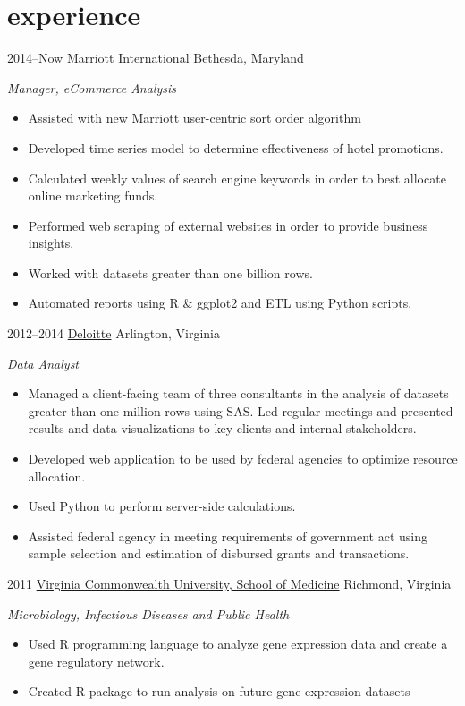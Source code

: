 \documentclass[]{friggeri-cv}
\begin{document}
\section{experience}

\begin{entrylist}
\entry
{2014--Now}
{\href{http://www.marriott.com/}{Marriott International}}
{Bethesda, Maryland}
{\emph{Manager, eCommerce Analysis}
\begin{itemize}
\renewcommand\labelitemi{--}
\item Assisted with new Marriott user-centric sort order algorithm
\item Developed time series model to determine effectiveness of hotel promotions. 
\item Calculated weekly values of search engine keywords in order to best allocate online marketing funds.
\item Performed web scraping of external websites in order to provide business insights.
\item Worked with datasets greater than one billion rows.
\item Automated reports using R \& ggplot2 and ETL using Python scripts.
\end{itemize}
}
\entry
{2012--2014}
{\href{http://www.deloitte.com/}{Deloitte}}
{Arlington, Virginia}
{\emph{Data Analyst}
\begin{itemize}
\renewcommand\labelitemi{--}
\item Managed a client-facing team of three consultants in the analysis of datasets greater than one million rows using SAS. 
Led regular meetings and presented results and data visualizations to key clients and internal stakeholders.
\item Developed web application to be used by federal agencies to optimize resource allocation. 
\item Used Python to perform server-side calculations.
\item Assisted federal agency in meeting requirements of government act using sample selection and estimation of disbursed grants and transactions.
\end{itemize}
}
\entry
{2011}
{\href{http://www.medschool.vcu.edu}{Virginia Commonwealth University, School of Medicine}}
{Richmond, Virginia}
{\emph{Microbiology, Infectious Diseases and Public Health}
\begin{itemize}
\renewcommand\labelitemi{--}
\item Used R programming language to analyze gene expression data and create a gene regulatory network.
\item Created R package to run analysis on future gene expression datasets
\end{itemize}
}
\end{entrylist}
\end{document}
